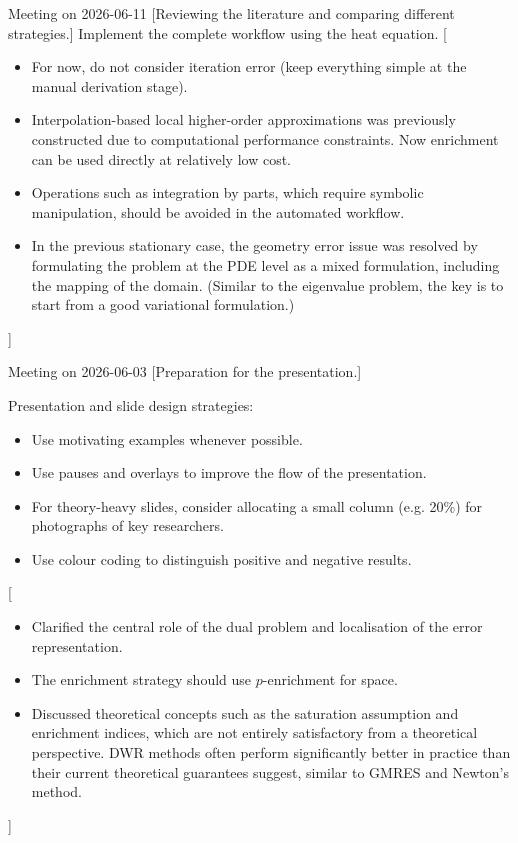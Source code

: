 \documentclass[11pt,a4paper]{article}
\begin{document}
\meet
{Meeting on 2026-06-11}
[Reviewing the literature and comparing different strategies.]
{Implement the complete workflow using the heat equation.}
[\begin{itemize}
    \item For now, do not consider iteration error (keep everything simple at the manual derivation stage).
    \item Interpolation-based local higher-order approximations was previously constructed due to computational performance constraints. Now enrichment can be used directly at relatively low cost.
    \item Operations such as integration by parts, which require symbolic manipulation, should be avoided in the automated workflow.
    \item[*] In the previous stationary case, the geometry error issue was resolved by formulating the problem at the PDE level as a mixed formulation, including the mapping of the domain. (Similar to the eigenvalue problem, the key is to start from a good variational formulation.)
\end{itemize}]
\vspace{1.5em}



\meet
{Meeting on 2026-06-03}
[Preparation for the presentation.]
{Presentation and slide design strategies:
\begin{itemize}
    \item Use motivating examples whenever possible.
    \item Use pauses and overlays to improve the flow of the presentation.
    \item For theory-heavy slides, consider allocating a small column (e.g. 20\%) for photographs of key researchers.
    \item Use colour coding to distinguish positive and negative results.
\end{itemize}
}
[\begin{itemize}
    \item Clarified the central role of the dual problem and localisation of the error representation.
    \item The enrichment strategy should use $p$-enrichment for space.
    \item Discussed theoretical concepts such as the saturation assumption and enrichment indices, which are not entirely satisfactory from a theoretical perspective. DWR methods often perform significantly better in practice than their current theoretical guarantees suggest, similar to GMRES and Newton's method.
\end{itemize}]
\vspace{1.5em}
\end{document}
